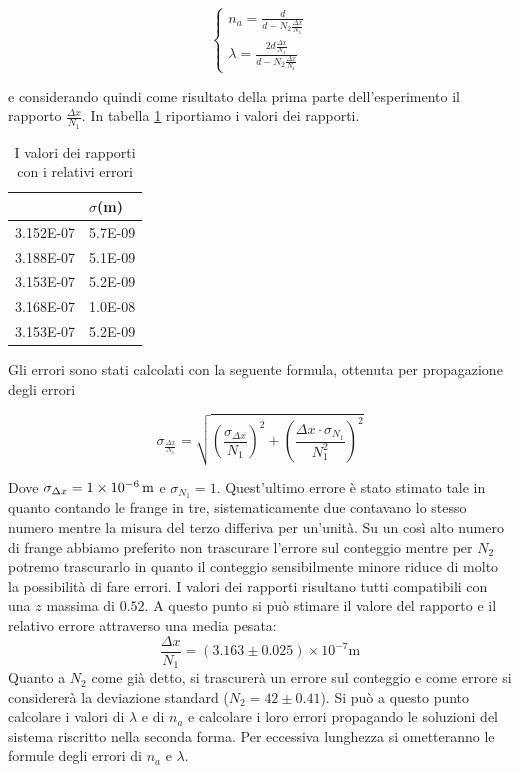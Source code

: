 \documentclass[a4paper,11pt]{article}
\newcommand{\ddfrac}[2]{\ensuremath{\frac{\displaystyle #1}{\displaystyle #2}}}
\begin{document}
\begin{equation}
\begin{cases}
n_a = \ddfrac{d}{d - N_2 \frac{\Delta x}{N _1}} \\ \lambda = \ddfrac{2 d \frac{\Delta x}{N _1}}{d - N_2 \frac{\Delta x}{N _1}}
\end{cases}
\end{equation}

e considerando quindi come risultato della prima parte dell'esperimento il rapporto $\frac{\Delta x}{N_1}$. In tabella \ref{rapporti} riportiamo i valori dei rapporti.

\begin{table}[htbp]
	\centering
	\caption{I valori dei rapporti con i relativi errori}
	\begin{tabular}{rr}
		\bottomrule
		\rowcolor[rgb]{ .267,  .447,  .769} \multicolumn{1}{l}{\textcolor[rgb]{ 1,  1,  1}{\textbf{$\Delta x/N1$ (m)}}} & \multicolumn{1}{l}{\textcolor[rgb]{ 1,  1,  1}{\textbf{$\sigma$(m)}}} \\
		\toprule
		\rowcolor[rgb]{ .851,  .851,  .851} 3.152E-07 & 5.7E-09 \\
		3.188E-07 & 5.1E-09 \\
		\rowcolor[rgb]{ .851,  .851,  .851} 3.153E-07 & 5.2E-09 \\
		3.168E-07 & 1.0E-08 \\
		\rowcolor[rgb]{ .851,  .851,  .851} 3.153E-07 & 5.2E-09 \\
		\toprule
	\end{tabular}%
	\label{rapporti}%
\end{table}%

Gli errori sono stati calcolati con la seguente formula, ottenuta per propagazione degli errori

\begin{equation}
\sigma _{\frac{\Delta x}{N _1}} = \sqrt{\left( \frac{\sigma _{\Delta x}}{N_1} \right) ^2 + \left( \frac{\Delta x \cdot \sigma _{N_1}}{N_1 ^2} \right) ^2}
\end{equation}

Dove $\sigma _{\Delta x} = \SI{1E-06}{m}$ e $\sigma _{N_1} = 1$. Quest'ultimo errore è stato stimato tale in quanto contando le frange in tre, sistematicamente due contavano lo stesso numero mentre la misura del terzo differiva per un'unità. Su un così alto numero di frange abbiamo preferito non trascurare l'errore sul conteggio mentre per $N _2$ potremo trascurarlo in quanto il conteggio sensibilmente minore riduce di molto la possibilità di fare errori. I valori dei rapporti risultano tutti compatibili con una $z$ massima di $0.52$.
A questo punto si può stimare il valore del rapporto e il relativo errore attraverso una media pesata: $$\frac{\Delta x}{N _1} = (\num{3.163} \pm \num{0.025}) \times 10 ^{-7} \text{m}$$ Quanto a $N _2$ come già detto, si trascurerà un errore sul conteggio e come errore si considererà la deviazione standard ($N _2 = 42 \pm 0.41$). Si può a questo punto calcolare i valori di $\lambda$ e di $n _a$ e calcolare i loro errori propagando le soluzioni del sistema riscritto nella seconda forma. Per eccessiva lunghezza si ometteranno le formule degli errori di $n _a$ e $\lambda$.
\end{document}
